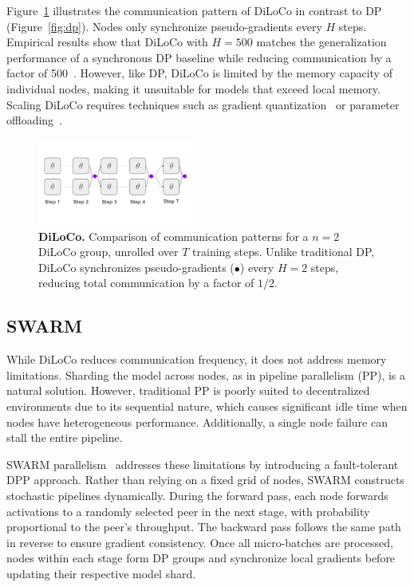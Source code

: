 \documentclass{article}
\newcommand{\purplecircle}{\textcolor{ppurple}{\LARGE$\bullet$}}
\begin{document}
Figure~\ref{fig:diloco} illustrates the communication pattern of DiLoCo in contrast to DP (Figure~\ref{fig:dp}). Nodes only synchronize pseudo-gradients every $H$ steps. Empirical results show that DiLoCo with $H=500$ matches the generalization performance of a synchronous DP baseline while reducing communication by a factor of 500~\cite{douillard2023diloco,jaghouar2024opendiloco}. However, like DP, DiLoCo is limited by the memory capacity of individual nodes, making it unsuitable for models that exceed local memory. Scaling DiLoCo requires techniques such as gradient quantization~\cite{jaghouar2024intellect1} or parameter offloading~\cite{cui2016}.

\begin{figure}[ht]
    \centering
    \vspace{0.5cm}
    \includegraphics[width=0.45\textwidth]{figures/diloco.pdf}
    \caption{\textbf{DiLoCo.} Comparison of communication patterns for a $n=2$ DiLoCo group, unrolled over $T$ training steps. Unlike traditional DP, DiLoCo synchronizes pseudo-gradients (\purplecircle) every $H=2$ steps, reducing total communication by a factor of $1/2$.}
    \label{fig:diloco}
\end{figure}

\subsection{SWARM}

While DiLoCo reduces communication frequency, it does not address memory limitations. Sharding the model across nodes, as in pipeline parallelism (PP), is a natural solution. However, traditional PP is poorly suited to decentralized environments due to its sequential nature, which causes significant idle time when nodes have heterogeneous performance. Additionally, a single node failure can stall the entire pipeline.

SWARM parallelism~\cite{ryabinin2023swarm} addresses these limitations by introducing a fault-tolerant DPP approach. Rather than relying on a fixed grid of nodes, SWARM constructs stochastic pipelines dynamically. During the forward pass, each node forwards activations to a randomly selected peer in the next stage, with probability proportional to the peer's throughput. The backward pass follows the same path in reverse to ensure gradient consistency. Once all micro-batches are processed, nodes within each stage form DP groups and synchronize local gradients before updating their respective model shard.
\end{document}
